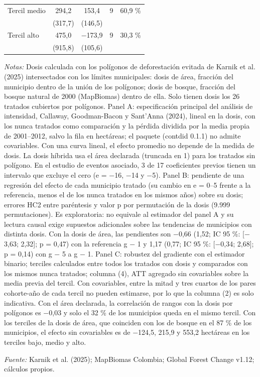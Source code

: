 \begin{table}[htbp]
\begin{threeparttable}
\begin{tabular}{@{}lcccc@{}}
Tercil medio & 294,2 & 153,4 & 9 & 60,9 \% \\
 & (317,7) & (146,5) &  &  \\
Tercil alto & 475,0 & $-$173,9 & 9 & 30,3 \% \\
 & (915,8) & (105,6) &  &  \\
\bottomrule
\end{tabular}
\begin{tablenotes}[flushleft]
\footnotesize
\item \textit{Notas:} Dosis calculada con los polígonos de deforestación evitada de Karnik et al. (2025) intersectados con los límites municipales: dosis de área, fracción del municipio dentro de la unión de los polígonos; dosis de bosque, fracción del bosque natural de 2000 (MapBiomas) dentro de ella. Solo tienen dosis los 26 tratados cubiertos por polígonos. Panel A: especificación principal del análisis de intensidad, Callaway, Goodman-Bacon y Sant’Anna (2024), lineal en la dosis, con los nunca tratados como comparación y la pérdida dividida por la media propia de 2001--2012, salvo la fila en hectáreas; el paquete (contdid 0.1.1) no admite covariables. Con una curva lineal, el efecto promedio no depende de la medida de dosis. La dosis híbrida usa el área declarada (truncada en 1) para los tratados sin polígono. En el estudio de eventos asociado, 3 de 17 coeficientes previos tienen un intervalo que excluye el cero (e = $-$16, $-$14 y $-$5). Panel B: pendiente de una regresión del efecto de cada municipio tratado (su cambio en e = 0--5 frente a la referencia, menos el de los nunca tratados en los mismos años) sobre su dosis; errores HC2 entre paréntesis y valor p por permutación de la dosis (9.999 permutaciones). Es exploratoria: no equivale al estimador del panel A y su lectura causal exige supuestos adicionales sobre las tendencias de municipios con distinta dosis. Con la dosis de área, las pendientes son $-$0,66 (1,52; IC 95 \%: [$-$3,63; 2,32]; p = 0,47) con la referencia g $-$ 1 y 1,17 (0,77; IC 95 \%: [$-$0,34; 2,68]; p = 0,14) con g $-$ 5 a g $-$ 1. Panel C: robustez del gradiente con el estimador binario; terciles calculados entre todos los tratados con dosis y comparados con los mismos nunca tratados; columna (4), ATT agregado sin covariables sobre la media previa del tercil. Con covariables, entre la mitad y tres cuartos de los pares cohorte-año de cada tercil no pueden estimarse, por lo que la columna (2) es solo indicativa. Con el área declarada, la correlación de rangos con la dosis por polígonos es $-$0,03 y solo el 32 \% de los municipios queda en el mismo tercil. Con los terciles de la dosis de área, que coinciden con los de bosque en el 87 \% de los municipios, el efecto sin covariables es de $-$124,5, 215,9 y 553,2 hectáreas en los terciles bajo, medio y alto.
\item \textit{Fuente:} Karnik et al. (2025); MapBiomas Colombia; Global Forest Change v1.12; cálculos propios.
\end{tablenotes}
\end{threeparttable}
\end{table}
